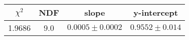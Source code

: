 \begin{tabular}{|c|c|c|c|}

\hline
$\chi^{2}$ & NDF & slope & y-intercept  \\
\hline
1.9686 & 9.0 & $0.0005\pm0.0002$ & $0.9552\pm0.014$ \\
\hline

\end{tabular}